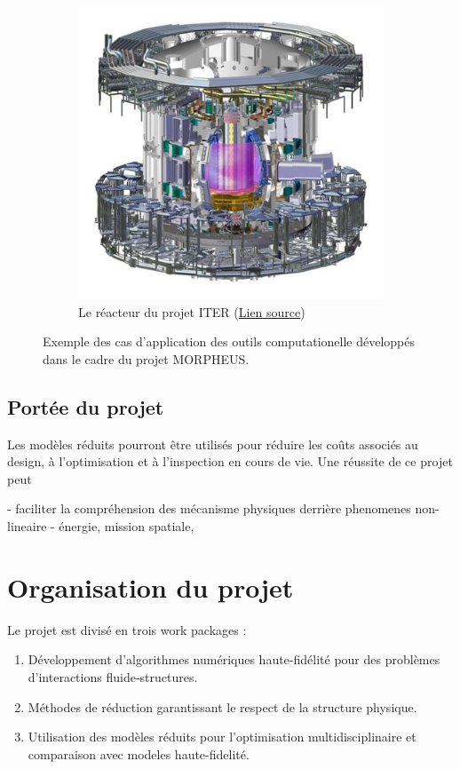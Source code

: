 \documentclass[french]{article}
\begin{document}
\begin{figure}[t]
\begin{subfigure}[t]{0.25\textwidth}
		\includegraphics[width=\columnwidth]{tcws.jpg}%
		\caption{Le réacteur du projet ITER (\href{https://www.iter.org/newsline/-/1119}{Lien source})}
		\label{fig:sofi-mit}
	\end{subfigure}
	\caption[]{Exemple des cas d'application des outils computationelle développés dans le cadre du projet MORPHEUS.}%
	\label{fig:applications}%
\end{figure}


\subsection{Portée du projet}

Les modèles réduits pourront être utilisés pour réduire les  co\^{u}ts associés au design, \`a l'optimisation et \`a l'inspection en cours de vie. Une réussite de ce projet peut 

- faciliter la compréhension des mécanisme physiques derrière phenomenes non-lineaire
- énergie, mission spatiale, 


\section{Organisation du projet}
Le projet est divisé en trois work packages :

\begin{enumerate}
	\item Développement d'algorithmes numériques haute-fidélité pour des problèmes d'interactions fluide-structures.
	\item Méthodes de réduction garantissant le respect de la structure physique. 
	\item Utilisation des modèles réduits pour l'optimisation multidisciplinaire et comparaison avec modeles haute-fidelité.
\end{enumerate}
\end{document}
